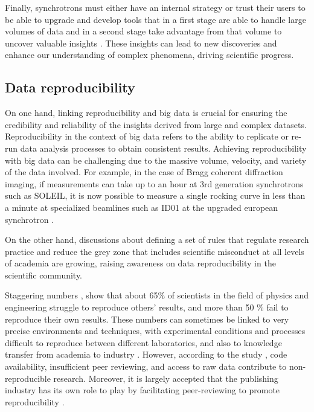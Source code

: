 Finally, synchrotrons must either have an internal strategy or trust their users to be able to upgrade and develop tools that in a first stage are able to handle large volumes of data and in a second stage take advantage from that volume to uncover valuable insights \parencite{WangIEEE2016, Khaleghi2019}.
These insights can lead to new discoveries and enhance our understanding of complex phenomena, driving scientific progress.


\subsection{Data reproducibility}

On one hand, linking reproducibility and big data is crucial for ensuring the credibility and reliability of the insights derived from large and complex datasets.
Reproducibility in the context of big data refers to the ability to replicate or re-run data analysis processes to obtain consistent results.
Achieving reproducibility with big data can be challenging due to the massive volume, velocity, and variety of the data involved.
For example, in the case of Bragg coherent diffraction imaging, if measurements can take up to an hour at 3rd generation synchrotrons such as SOLEIL, it is now possible to measure a single rocking curve in less than a minute at specialized beamlines such as ID01 at the upgraded european synchrotron \parencite{Richter2019}.

On the other hand, discussions about defining a set of rules that regulate research practice \parencite{Kretser2019} and reduce the grey zone that includes scientific misconduct at all levels of academia \parencite{Kornfeld2016} are growing, raising awareness on data reproducibility in the scientific community.

Staggering numbers \parencite{Baker2016}, show that about 65\% of scientists in the field of physics and engineering struggle to reproduce others' results, and more than 50 \% fail to reproduce their own results.
These numbers can sometimes be linked to very precise environments and techniques, with experimental conditions and processes difficult to reproduce between different laboratories, and also to knowledge transfer from academia to industry \parencite{DanielSarwitz2015}.
However, according to the study  \parencite{Baker2016}, code availability, insufficient peer reviewing, and access to raw data contribute to non-reproducible research.
Moreover, it is largely accepted that the publishing industry has its own role to play by facilitating peer-reviewing to promote reproducibility \parencite{Lee2017}.

